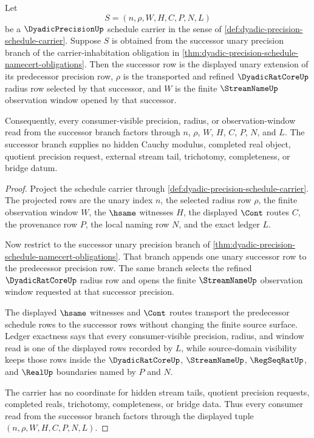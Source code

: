 \begin{theorem}
\label{thm:dyadic-precision-successor-schedule-exactness}
Let
$$
S=(n,\rho,W,H,C,P,N,L)
$$
be a $\DyadicPrecisionUp$ schedule carrier in the sense of \autoref{def:dyadic-precision-schedule-carrier}. Suppose $S$ is obtained from the successor unary precision branch of the carrier-inhabitation obligation in \autoref{thm:dyadic-precision-schedule-namecert-obligations}. Then the successor row is the displayed unary extension of its predecessor precision row, $\rho$ is the transported and refined $\DyadicRatCoreUp$ radius row selected by that successor, and $W$ is the finite $\StreamNameUp$ observation window opened by that successor.

Consequently, every consumer-visible precision, radius, or observation-window read from the successor branch factors through $n$, $\rho$, $W$, $H$, $C$, $P$, $N$, and $L$. The successor branch supplies no hidden Cauchy modulus, completed real object, quotient precision request, external stream tail, trichotomy, completeness, or bridge datum.
\end{theorem}
\begin{proof}
Project the schedule carrier through \autoref{def:dyadic-precision-schedule-carrier}. The projected rows are the unary index $n$, the selected radius row $\rho$, the finite observation window $W$, the $\hsame$ witnesses $H$, the displayed $\Cont$ routes $C$, the provenance row $P$, the local naming row $N$, and the exact ledger $L$.

Now restrict to the successor unary precision branch of \autoref{thm:dyadic-precision-schedule-namecert-obligations}. That branch appends one unary successor row to the predecessor precision row. The same branch selects the refined $\DyadicRatCoreUp$ radius row and opens the finite $\StreamNameUp$ observation window requested at that successor precision.

The displayed $\hsame$ witnesses and $\Cont$ routes transport the predecessor schedule rows to the successor rows without changing the finite source surface. Ledger exactness says that every consumer-visible precision, radius, and window read is one of the displayed rows recorded by $L$, while source-domain visibility keeps those rows inside the $\DyadicRatCoreUp$, $\StreamNameUp$, $\RegSeqRatUp$, and $\RealUp$ boundaries named by $P$ and $N$.

The carrier has no coordinate for hidden stream tails, quotient precision requests, completed reals, trichotomy, completeness, or bridge data. Thus every consumer read from the successor branch factors through the displayed tuple $(n,\rho,W,H,C,P,N,L)$.
\end{proof}

